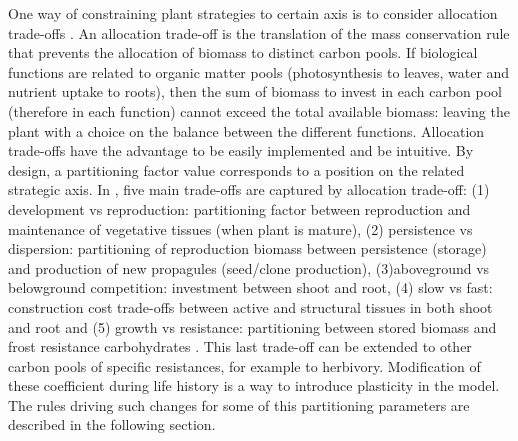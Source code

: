 One way of constraining plant strategies to certain axis is to consider allocation trade-offs \cite{kleidon_global_2000, reineking_environmental_2006}. An allocation trade-off is the translation of the mass conservation rule that prevents the allocation of biomass to distinct carbon pools. If biological functions are related to organic matter pools (photosynthesis to leaves, water and nutrient uptake to roots), then the sum of biomass to invest in each carbon pool (therefore in each function) cannot exceed the total available biomass: leaving the plant with a choice on the balance between the different functions. Allocation trade-offs have the advantage to be easily implemented and be intuitive. By design, a partitioning factor value corresponds to a position on the related strategic axis. In \model, five main trade-offs are captured by allocation trade-off: (1) development vs reproduction: partitioning factor between reproduction and maintenance of vegetative tissues (when plant is mature), (2)  persistence vs dispersion: partitioning of reproduction biomass between persistence (storage) and production of new propagules (seed/clone production), (3)aboveground vs belowground competition: investment between shoot and root, \cite{kleidon_global_2000, reineking_environmental_2006, taubert_modelling_2014}(4) slow vs fast: construction cost trade-offs between active and structural tissues in both shoot and root and (5) growth vs resistance: partitioning between stored biomass and frost resistance carbohydrates \cite{cai_changes_2004}. This last trade-off can be extended to other carbon pools of specific resistances, for example to herbivory. Modification of these coefficient during life history is a way to introduce plasticity in the model. The rules driving such changes for some of this partitioning parameters are described in the following section.\\


